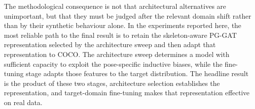 The methodological consequence is not that architectural alternatives
are unimportant,
but that they must be judged after the relevant domain shift rather
than by their synthetic behaviour alone.
In the experiments reported here, the most reliable path to the final
result is to retain the skeleton-aware PG-GAT representation selected
by the architecture sweep and then adapt that representation to COCO.
The architecture sweep determines a model with sufficient capacity
to exploit the pose-specific inductive biases,
while the fine-tuning stage adapts those features to the target
distribution.
The headline result is the product of these two stages,
architecture selection establishes the representation,
and target-domain fine-tuning makes that representation effective
on real data.